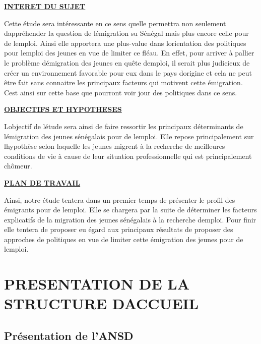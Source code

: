 \documentclass[
  letterpaper,
  DIV=11,
  numbers=noendperiod]{scrartcl}
\begin{document}
\ul{\textbf{INTERET DU SUJET}}

Cette étude sera intéressante en ce sens qu\textquotesingle elle
permettra non seulement d\textquotesingle appréhender la question de
l\textquotesingle émigration su Sénégal mais plus encore celle pour de
l\textquotesingle emploi. Ainsi elle apportera une plus-value dans
l\textquotesingle orientation des politiques pour
l\textquotesingle emploi des jeunes en vue de limiter ce fléau. En
effet, pour arriver à pallier le problème d\textquotesingle émigration
des jeunes en quête d\textquotesingle emploi, il serait plus judicieux
de créer un environnement favorable pour eux dans le pays
d\textquotesingle origine et cela ne peut être fait sans connaitre les
principaux facteurs qui motivent cette émigration. C\textquotesingle est
ainsi sur cette base que pourront voir jour des politiques dans ce sens.

\ul{\textbf{OBJECTIFS ET HYPOTHESES}}

L\textquotesingle objectif de l\textquotesingle étude sera ainsi de
faire ressortir les principaux déterminants de
l\textquotesingle émigration des jeunes sénégalais pour de
l\textquotesingle emploi. Elle repose principalement sur
l\textquotesingle hypothèse selon laquelle les jeunes migrent à la
recherche de meilleures conditions de vie à cause de leur situation
professionnelle qui est principalement chômeur.

\ul{\textbf{PLAN DE TRAVAIL}}

Ainsi, notre étude tentera dans un premier temps de présenter le profil
des émigrants pour de l\textquotesingle emploi. Elle se chargera par la
suite de déterminer les facteurs explicatifs de la migration des jeunes
sénégalais à la recherche d\textquotesingle emploi. Pour finir elle
tentera de proposer eu égard aux principaux résultats de proposer des
approches de politiques en vue de limiter cette émigration des jeunes
pour de l\textquotesingle emploi.

\newpage{}

\hypertarget{presentation-de-la-structure-daccueil}{%
\section{PRESENTATION DE LA STRUCTURE
D\textquotesingle ACCUEIL}\label{presentation-de-la-structure-daccueil}}

\hypertarget{pruxe9sentation-de-lansd}{%
\subsection{Présentation de l'ANSD}\label{pruxe9sentation-de-lansd}}
\end{document}
